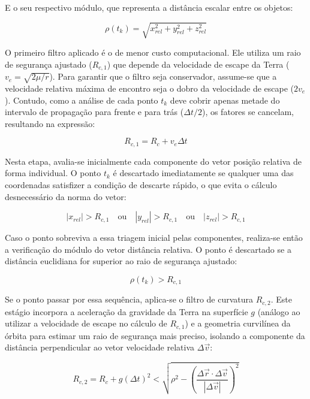 E o seu respectivo módulo, que representa a distância escalar entre os objetos:

\begin{equation}
    \rho(t_k) = \sqrt{x_{rel}^2 + y_{rel}^2 + z_{rel}^2}
\end{equation}

O primeiro filtro aplicado é o de menor custo computacional. Ele utiliza um raio de segurança ajustado ($R_{c,1}$) que depende da velocidade de escape da Terra ($v_e = \sqrt{2\mu/r}$). Para garantir que o filtro seja conservador, assume-se que a velocidade relativa máxima de encontro seja o dobro da velocidade de escape ($2v_e$). Contudo, como a análise de cada ponto $t_k$ deve cobrir apenas metade do intervalo de propagação para frente e para trás ($\Delta t / 2$), os fatores se cancelam, resultando na expressão:

\begin{equation}
    R_{c,1} = R_c + v_e \Delta t
\end{equation}

Nesta etapa, avalia-se inicialmente cada componente do vetor posição relativa de forma individual. O ponto $t_k$ é descartado imediatamente se qualquer uma das coordenadas satisfizer a condição de descarte rápido, o que evita o cálculo desnecessário da norma do vetor:

\begin{equation}
    |x_{rel}| > R_{c,1} \quad \text{ou} \quad |y_{rel}| > R_{c,1} \quad \text{ou} \quad |z_{rel}| > R_{c,1}
\end{equation}

Caso o ponto sobreviva a essa triagem inicial pelas componentes, realiza-se então a verificação do módulo do vetor distância relativa. O ponto é descartado se a distância euclidiana for superior ao raio de segurança ajustado:

\begin{equation}
    \rho(t_k) > R_{c,1}
\end{equation}

Se o ponto passar por essa sequência, aplica-se o filtro de curvatura $R_{c,2}$. Este estágio incorpora a aceleração da gravidade da Terra na superfície $g$ (análogo ao utilizar a velocidade de escape no cálculo de $R_{c,1}$) e a geometria curvilínea da órbita para estimar um raio de segurança mais preciso, isolando a componente da distância perpendicular ao vetor velocidade relativa $\Delta \vec{v}$:

\begin{equation}
    R_{c,2} = R_c + g(\Delta t)^2 < \sqrt{\rho^2 - \left(\frac{\Delta \vec{r} \cdot \Delta \vec{v}}{|\Delta \vec{v}|}\right)^2}
\end{equation}

